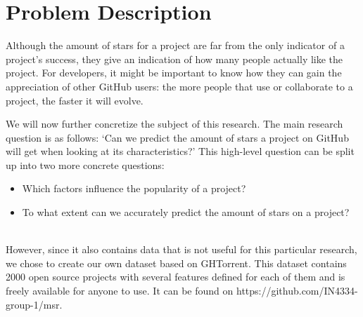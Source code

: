 \section{Problem Description}
    Although the amount of stars for a project are far from the only indicator of a project's success, they give an indication of how many people actually like the project.
    For developers, it might be important to know how they can gain the appreciation of other GitHub users: the more people that use or collaborate to a project, the faster it will evolve.

    We will now further concretize the subject of this research. 
    The main research question is as follows: `Can we predict the amount of stars a project on GitHub will get when looking at its characteristics?'
    This high-level question can be split up into two more concrete questions:
    \begin{itemize}
        \item Which factors influence the popularity of a project?
        \item To what extent can we accurately predict the amount of stars on a project?
    \end{itemize}
    
    \\
    

    However, since it also contains data that is not useful for this particular research, we chose to create our own dataset based on GHTorrent.
    This dataset contains 2000 open source projects with several features defined for each of them and is freely available for anyone to use.
    It can  be found on https://github.com/IN4334-group-1/msr.


